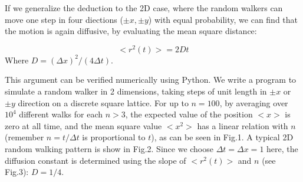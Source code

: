 \documentclass[aps,prl,preprint,superscriptaddress]{revtex4}
\begin{document}
	If we generalize the deduction to the 2D case, where the random walkers can move one step in four diections ($\pm x, \pm y$) with equal probability, we can find that the motion is again diffusive, by evaluating the mean square distance:
	
	\begin{equation}
	<r^2(t)> = 2Dt
	\end{equation}
	Where $D = (\Delta x)^2/(4\Delta t)$.
	
	This argument can be verified numerically using Python. We write a program to simulate a random walker in 2 dimensions, taking steps
	of unit length in $\pm x$ or $\pm y$ direction on a discrete square lattice. For up to $n = 100$, by averaging over $10^4$ different walks for each $n > 3$, the expected value of the position $ <x> $ is zero at all time, and the mean square value  $ <x^2> $ has a linear relation with $n$(remember $n =t/\Delta t$ is proportional to $t$), as can be seen in Fig.1. A typical 2D random walking pattern is show in Fig.2. Since we choose $\Delta t = \Delta x = 1$ here, the diffusion constant is determined using the slope of $<r^2(t)>$ and $n$ (see Fig.3): $D = 1/4$. 
	
\end{document}
